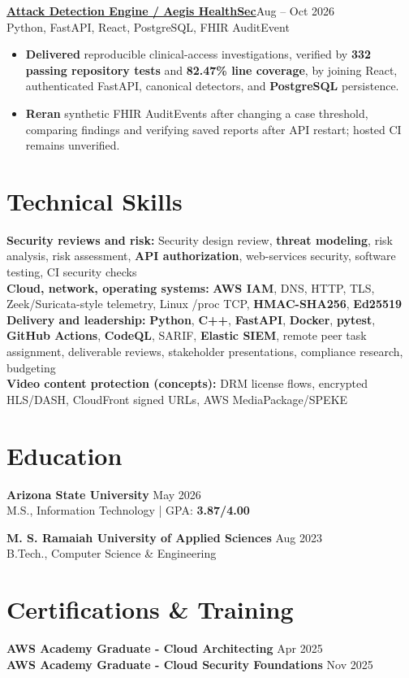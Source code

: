 \documentclass[letterpaper,10pt]{article}
\newcommand{\proj}[3]{\noindent\textbf{#1}\hfill{\fontsize{10}{12}\selectfont #3}\\{\fontsize{10}{12}\selectfont #2}\vspace{1.5pt}}
\begin{document}
\proj{\href{https://github.com/poojakira/attack-detection-engine/blob/875299dd6a7ed061df792d1150371c688383fc05/release-evidence/RELEASE_ASSESSMENT.md}{Attack Detection Engine / Aegis HealthSec}}{Python, FastAPI, React, PostgreSQL, FHIR AuditEvent}{Aug -- Oct 2026}
\begin{itemize}
\item \textbf{Delivered} reproducible clinical-access investigations, verified by \textbf{332 passing repository tests} and \textbf{82.47\% line coverage}, by joining React, authenticated FastAPI, canonical detectors, and \textbf{PostgreSQL} persistence.
\item \textbf{Reran} synthetic FHIR AuditEvents after changing a case threshold, comparing findings and verifying saved reports after API restart; hosted CI remains unverified.
\end{itemize}

\vspace{1pt}

\section{Technical Skills}
{\fontsize{10.2}{12}\selectfont
\textbf{Security reviews and risk:} Security design review, \textbf{threat modeling}, risk analysis, risk assessment, \textbf{API authorization}, web-services security, software testing, CI security checks\\[2pt]
\textbf{Cloud, network, operating systems:} \textbf{AWS IAM}, DNS, HTTP, TLS, Zeek/Suricata-style telemetry, Linux /proc TCP, \textbf{HMAC-SHA256}, \textbf{Ed25519}\\[2pt]
\textbf{Delivery and leadership:} \textbf{Python}, \textbf{C++}, \textbf{FastAPI}, \textbf{Docker}, \textbf{pytest}, \textbf{GitHub Actions}, \textbf{CodeQL}, SARIF, \textbf{Elastic SIEM}, remote peer task assignment, deliverable reviews, stakeholder presentations, compliance research, budgeting\\[2pt]
\textbf{Video content protection (concepts):} DRM license flows, encrypted HLS/DASH, CloudFront signed URLs, AWS MediaPackage/SPEKE}

\section{Education}
\textbf{Arizona State University} \hfill May 2026\\
M.S., Information Technology | GPA: \textbf{3.87/4.00}\vspace{4pt}

\textbf{M. S. Ramaiah University of Applied Sciences} \hfill Aug 2023\\
B.Tech., Computer Science \& Engineering

\section{Certifications \& Training}
\textbf{AWS Academy Graduate - Cloud Architecting} \hfill Apr 2025\\[2pt]
\textbf{AWS Academy Graduate - Cloud Security Foundations} \hfill Nov 2025
\end{document}
